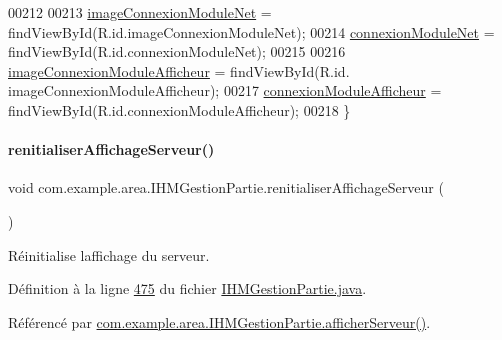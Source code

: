\begin{DoxyCode}
00212 
00213         \hyperlink{classcom_1_1example_1_1area_1_1_i_h_m_gestion_partie_a98c578b0056e17278e27aacefa933952}{imageConnexionModuleNet} = findViewById(R.id.imageConnexionModuleNet);
00214         \hyperlink{classcom_1_1example_1_1area_1_1_i_h_m_gestion_partie_a80163f148ea0264b5395a7c55ee5b4ed}{connexionModuleNet} = findViewById(R.id.connexionModuleNet);
00215 
00216         \hyperlink{classcom_1_1example_1_1area_1_1_i_h_m_gestion_partie_aae13761712b67eac1e69ac900c265ffc}{imageConnexionModuleAfficheur} = findViewById(R.id.
      imageConnexionModuleAfficheur);
00217         \hyperlink{classcom_1_1example_1_1area_1_1_i_h_m_gestion_partie_a77e3d7f58799c309694b3ccbb3318150}{connexionModuleAfficheur} = findViewById(R.id.connexionModuleAfficheur);
00218     \}
\end{DoxyCode}
\mbox{\label{classcom_1_1example_1_1area_1_1_i_h_m_gestion_partie_a4f5930a69896d1d75add34badfb168eb}} 
\paragraph{\texorpdfstring{renitialiser\+Affichage\+Serveur()}{renitialiserAffichageServeur()}}
{\footnotesize\ttfamily void com.\+example.\+area.\+I\+H\+M\+Gestion\+Partie.\+renitialiser\+Affichage\+Serveur (\begin{DoxyParamCaption}{ }\end{DoxyParamCaption})\hspace{0.3cm}{\ttfamily [private]}}



Réinitialise l\textquotesingle{}affichage du serveur. 



Définition à la ligne \hyperlink{_i_h_m_gestion_partie_8java_source_l00475}{475} du fichier \hyperlink{_i_h_m_gestion_partie_8java_source}{I\+H\+M\+Gestion\+Partie.\+java}.



Référencé par \hyperlink{_i_h_m_gestion_partie_8java_source_l00447}{com.\+example.\+area.\+I\+H\+M\+Gestion\+Partie.\+afficher\+Serveur()}.


